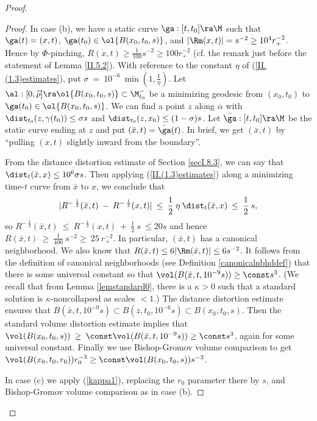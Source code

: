 \begin{proof}
\begin{proof}
In case (b), we have a static curve $\ga:[t,t_0]\ra\M$
such that $\ga(t)=(x,t)$, $\ga(t_0)\in \ol{B(x_0,t_0,s)}$,
and $|\Rm(x,t)|=s^{-2}\geq 10^4r_+^{-2}$.
Hence by $\Phi$-pinching,
$R(x,t)\geq \frac{1}{100} s^{-2} \geq 100 r_+^{-2}$
(cf. the remark just before the statement of
Lemma \ref{II.5.2}).
With reference to the constant $\eta$ of
(\ref{II.(1.3)estimates}),
put $\sigma \: = \: 10^{-6} \: \min \left( 1,
\frac{1}{\eta} \right)$.
Let
$\al:[0,\widehat{\rho}]\ra \ol{B(x_0,t_0,s)}\subset \M_{t_0}^-$
be a minimizing geodesic from $(x_0,t_0)$ to
$\ga(t_0)\in \ol{B(x_0,t_0,s)}$. We can find a point
$z$ along $\alpha$ with $\dist_{t_0}(z, \gamma(t_0)) \le \sigma s$ and
$\dist_{t_0}(z, x_0) \le (1 - \sigma) s$.
Let $\bar\ga:[t,t_0]\ra\M$
be the static curve ending at $z$
and put $(\bar x,t)= \bar\ga(t)$.  In brief,
we get $(\bar x,t)$ by ``pulling $(x,t)$ slightly
inward from the boundary''.

From the distance distortion estimate of Section \ref{secI.8.3},
we can say that $\dist_{t} (\bar x, x) \le 10^6 \sigma s$.
Then applying (\ref{II.(1.3)estimates}) along a minimizing
time-$t$ curve from $\bar x$ to $x$, we conclude that
\begin{equation}
|R^{- \: \frac12}(\bar x, t) \: - \: R^{- \: \frac12}(x, t)| \: \le \:
\frac12 \: \eta \: \dist_{t} (\bar x, x) \: \le \: \frac12 \: s,
\end{equation}
so $R^{- \: \frac12}(\bar x, t) \: \le \:
R^{- \: \frac12}(x, t) \: + \: \frac12 \: s \: \le 20s$ and hence
$R(\bar x, t) \: \ge \: \frac{1}{400} \: s^{-2} \ge \: 25 \: r_+^{-2}$.
In particular, $(\bar x,t)$ has a canonical neighborhood.
We also know that $R(\bar x, t) \le 6 |\Rm (\bar x, t)| \le 6 s^{-2}$.
It follows from the definition of canonical neighborhoods
(see Definition \ref{canonicalnbhddef}) that
there is some universal constant so that
$\vol(B(\bar x,t,10^{-9}s) ) \ge \const s^3$.
(We recall that from Lemma \ref{lemstandard0},
there is a $\kappa>0$ such that a standard solution
is $\kappa$-noncollapsed as scales $<1$.)
The distance distortion
estimate ensures that $B(\bar x,t,10^{-9}s) \subset
B(z,t_0,10^{-6}s) \subset B(x_0,t_0,s)$. Then the standard volume
distortion estimate implies that
$\vol(B(x_0,t_0,s)) \: \ge \: \const
\vol(B(\bar x,t,10^{-9}s) ) \ge \const s^3$,
again for some universal constant.
Finally we use Bishop-Gromov volume comparison to get
$\vol(B(x_0,t_0,r_0))r_0^{-3}\geq \const \vol(B(x_0,t_0,s))s^{-3}$.

In case (c) we apply (\ref{kappa1}), replacing the
$r_0$ parameter there by $s$, and Bishop-Gromov
volume comparison as in case (b).
\end{proof}



\end{proof}

